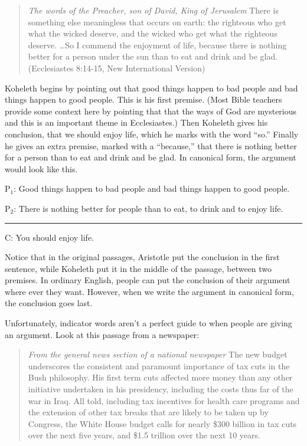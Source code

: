 \begin{quotation}
\noindent \textit{The words of the Preacher, son of David, King of Jerusalem} There is something else meaningless that occurs on earth: the righteous who get what the wicked deserve, and the wicked who get what the righteous deserve. \ldots So I commend the enjoyment of life, because there is nothing better for a person under the sun than to eat and drink and be glad. (Ecclesiastes 8:14-15, New International Version)
\end{quotation}

Koheleth begins by pointing out that good things happen to bad people and bad things happen to good people. This is his first premise. (Most Bible teachers provide some context here by pointing that that the ways of God are mysterious and this is an important theme in Ecclesiastes.) Then Koheleth gives his conclusion, that we should enjoy life, which he marks with the word ``so.'' Finally he gives an extra premise, marked with a ``because,'' that there is nothing better for a person than to eat and drink and be glad. In canonical form, the argument would look like this.


\begin{earg}
\item[P$_1$:] Good things happen to bad people and bad things happen to good people.
\item[P$_2$:] There is nothing better for people than to eat, to drink and to enjoy life.
\vspace{-.5em}
\item [] \rule{0.8\linewidth}{.5pt} 
\item[C:] You should enjoy life.
\end{earg} 

Notice that in the original passages, Aristotle put the conclusion in the first sentence, while Koheleth put it in the middle of the passage, between two premises. In ordinary English, people can put the conclusion of their argument where ever they want. However, when we write the argument in canonical form, the conclusion goes last.

Unfortunately, indicator words aren't a perfect guide to when people are giving an argument. Look at this passage from a newspaper:

\begin{quotation}
\noindent \textit{From the general news section of a national newspaper} The new budget underscores the consistent and paramount importance of tax cuts in the Bush philosophy. His first term cuts affected more money than any other initiative undertaken in his presidency, including the costs thus far of the war in Iraq. All told, including tax incentives for health care programs and the extension of other tax breaks that are likely to be taken up by Congress, the White House budget calls for nearly \$300 billion in tax cuts over the next five years, and \$1.5 trillion over the next 10 years.  \citep{Toner2006}
\end{quotation}

